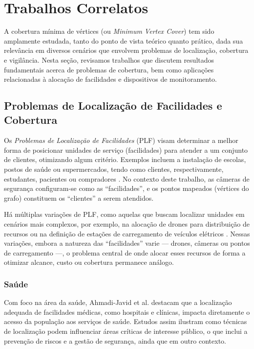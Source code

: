 \documentclass[12pt, a4paper]{report}
\begin{document}
\chapter{Trabalhos Correlatos}
A cobertura mínima de vértices (ou \emph{Minimum Vertex Cover}) tem sido amplamente estudada, tanto do ponto de vista teórico quanto prático, dada sua relevância em diversos cenários que envolvem problemas de localização, cobertura e vigilância. Nesta seção, revisamos trabalhos que discutem resultados fundamentais acerca de problemas de cobertura, bem como aplicações relacionadas à alocação de facilidades e dispositivos de monitoramento.

\section{Problemas de Localização de Facilidades e Cobertura}
Os \emph{Problemas de Localização de Facilidades} (PLF) visam determinar a melhor forma de posicionar unidades de serviço (facilidades) para atender a um conjunto de clientes, otimizando algum critério. Exemplos incluem a instalação de escolas, postos de saúde ou supermercados, tendo como clientes, respectivamente, estudantes, pacientes ou compradores \cite{Pizzolato2012}. No contexto deste trabalho, as câmeras de segurança configuram-se como as “facilidades”, e os pontos mapeados (vértices do grafo) constituem os “clientes” a serem atendidos. 

Há múltiplas variações de PLF, como aquelas que buscam localizar unidades em cenários mais complexos, por exemplo, na alocação de drones para distribuição de recursos \cite{Chuan2019} ou na definição de estações de carregamento de veículos elétricos \cite{Silva2019}. Nessas variações, embora a natureza das “facilidades” varie — drones, câmeras ou pontos de carregamento —, o problema central de onde alocar esses recursos de forma a otimizar alcance, custo ou cobertura permanece análogo.

\subsection{Saúde}
Com foco na área da saúde, Ahmadi-Javid et al. \cite{AhmadiJavid2017} destacam que a localização adequada de facilidades médicas, como hospitais e clínicas, impacta diretamente o acesso da população aos serviços de saúde. Estudos assim ilustram como técnicas de localização podem influenciar áreas críticas de interesse público, o que inclui a prevenção de riscos e a gestão de segurança, ainda que em outro contexto.
\end{document}
